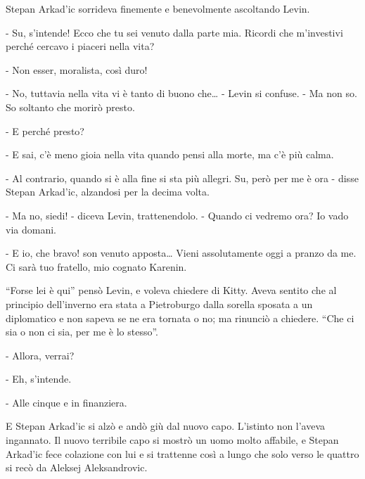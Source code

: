 Stepan Arkad'ic sorrideva finemente e benevolmente ascoltando Levin. 

- Su, s'intende! Ecco che tu sei venuto dalla parte mia. Ricordi che m'investivi perché cercavo i piaceri nella vita? 

- Non esser, moralista, così duro! 

- No, tuttavia nella vita vi è tanto di buono che\ldots{} - Levin si confuse. - Ma non so. So soltanto che morirò presto. 

- E perché presto? 

- E sai, c'è meno gioia nella vita quando pensi alla morte, ma c'è più calma. 

- Al contrario, quando si è alla fine si sta più allegri. Su, però per me è ora - disse Stepan Arkad'ic, alzandosi per la decima volta. 

- Ma no, siedi! - diceva Levin, trattenendolo. - Quando ci vedremo ora? Io vado via domani. 

- E io, che bravo! son venuto apposta\ldots{} Vieni assolutamente oggi a pranzo da me. Ci sarà tuo fratello, mio cognato Karenin. 

``Forse lei è qui'' pensò Levin, e voleva chiedere di Kitty. Aveva sentito che al principio dell'inverno era stata a Pietroburgo dalla sorella sposata a un diplomatico e non sapeva se ne era tornata o no; ma rinunciò a chiedere. ``Che ci sia o non ci sia, per me è lo stesso''. 

- Allora, verrai? 

- Eh, s'intende. 

- Alle cinque e in finanziera. 

E Stepan Arkad'ic si alzò e andò giù dal nuovo capo. L'istinto non l'aveva ingannato. Il nuovo terribile capo si mostrò un uomo molto affabile, e Stepan Arkad'ic fece colazione con lui e si trattenne così a lungo che solo verso le quattro si recò da Aleksej Aleksandrovic. 

\label{viii-3} 

